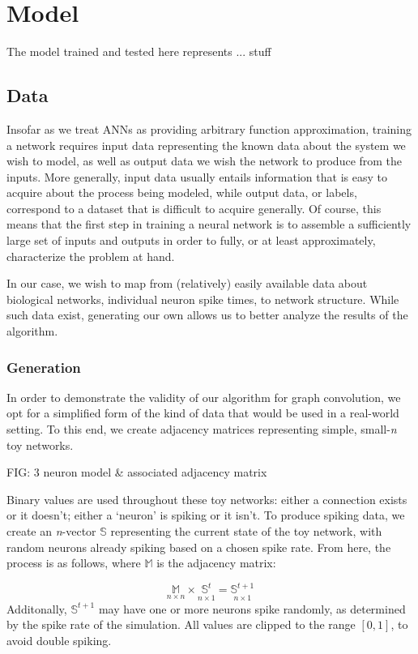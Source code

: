 \chapter{Model}
\label{model}
The model trained and tested here represents ... stuff

\section{Data}
\label{sec:data}
Insofar as we treat ANNs as providing arbitrary function approximation, training
a network requires input data representing the known data about the system we
wish to model, as well as output data we wish the network to produce from the
inputs. More generally, input data usually entails information that is easy to 
acquire about the process being modeled, while output data, or labels, 
correspond to a dataset that is difficult to acquire generally. Of course, this 
means that the first step in training a neural network is to assemble a 
sufficiently large set of inputs and outputs in order to fully, or at least 
approximately, characterize the problem at hand.

In our case, we wish to map from (relatively) easily available data about 
biological networks, individual neuron spike times, to network structure. While 
such data exist, generating our own allows us to better analyze the results of 
the algorithm.


\subsection{Generation}
In order to demonstrate the validity of our algorithm for graph convolution, we 
opt for a simplified form of the kind of data that would be used in a real-world 
setting.  To this end, we create adjacency matrices representing simple, 
small-\textit{n} toy networks.

FIG: 3 neuron model \& associated adjacency matrix

Binary values are used throughout these toy networks: either a connection exists 
or it doesn't; either a `neuron' is spiking or it isn't. To produce spiking 
data, we create an \textit{n}-vector $\mathbb{S}$ representing the current state 
of the toy network, with random neurons already spiking based on a chosen spike 
rate. From here, the process is as follows, where $\mathbb{M}$ is the adjacency 
matrix:

\[
	\underset{n \times n}{\mathbb{M}} \times \underset{n \times 1}{\mathbb{S}^t} 
	= \underset{n \times 1}{\mathbb{S}^{t+1}}
\]
Additonally, $\mathbb{S}^{t+1}$ may have one or more neurons spike randomly, as 
determined by the spike rate of the simulation. All values are clipped to the 
range $[0,1]$, to avoid double spiking.

